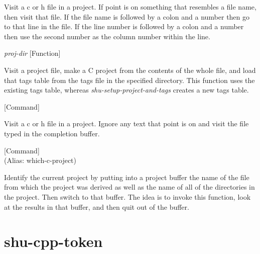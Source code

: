 \begin{doc-string}
Visit a c or h file in a project.  If point is on something that resembles a file
name, then visit that file.  If the file name is followed by a colon and a number
then go to that line in the file.  If the line number is followed by a colon and
a number then use the second number as the column number within the line.
\end{doc-string}

\vspace{1em}
\noindent
{}
\usebox{\funcname}\emph{proj-dir}
 \hfill [Function]

\begin{doc-string}
Visit a project file, make a C project from the contents of the whole file,
and load that tags table from the tags file in the specified directory.  This
function uses the existing tags table, whereas \emph{shu-setup-project-and-tags}
creates a new tags table.
\end{doc-string}

\vspace{1em}
\noindent
{}
\usebox{\funcname}
 \hfill [Command]

\begin{doc-string}
Visit a c or h file in a project.  Ignore any text that point is on and visit the
file typed in the completion buffer.
\end{doc-string}

\vspace{1em}
\noindent
{}
\usebox{\funcname}
 \hfill [Command]\\%
 (Alias: which-c-project)

\begin{doc-string}
Identify the current project by putting into a project buffer the name of the file
from which the project was derived as well as the name of all of the directories in the
project.  Then switch to that buffer.  The idea is to invoke this function, look at the
results in that buffer, and then quit out of the buffer.
\end{doc-string}

\eject
\section{shu-cpp-token}


